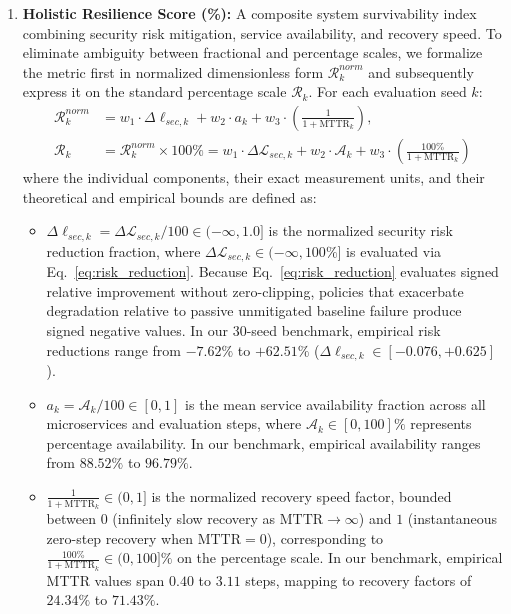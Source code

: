 \documentclass[11pt,a4paper]{article}
\begin{document}
\begin{enumerate}
    \item \textbf{Holistic Resilience Score (\%):} A composite system survivability index combining security risk mitigation, service availability, and recovery speed. To eliminate ambiguity between fractional and percentage scales, we formalize the metric first in normalized dimensionless form $\mathcal{R}_k^{norm}$ and subsequently express it on the standard percentage scale $\mathcal{R}_k$. For each evaluation seed $k$:
    \begin{align}
        \mathcal{R}_k^{norm} &= w_1 \cdot \Delta \ell_{sec, k} + w_2 \cdot a_k + w_3 \cdot \left(\frac{1}{1 + \text{MTTR}_k}\right), \label{eq:resilience_norm} \\
        \mathcal{R}_k &= \mathcal{R}_k^{norm} \times 100\% = w_1 \cdot \Delta \mathcal{L}_{sec, k} + w_2 \cdot \mathcal{A}_k + w_3 \cdot \left(\frac{100\%}{1 + \text{MTTR}_k}\right) \label{eq:resilience_pct}
    \end{align}
    where the individual components, their exact measurement units, and their theoretical and empirical bounds are defined as:
    \begin{itemize}
        \item $\Delta \ell_{sec, k} = \Delta \mathcal{L}_{sec, k} / 100 \in (-\infty, 1.0]$ is the normalized security risk reduction fraction, where $\Delta \mathcal{L}_{sec, k} \in (-\infty, 100\%]$ is evaluated via Eq.~\eqref{eq:risk_reduction}. Because Eq.~\eqref{eq:risk_reduction} evaluates signed relative improvement without zero-clipping, policies that exacerbate degradation relative to passive unmitigated baseline failure produce signed negative values. In our 30-seed benchmark, empirical risk reductions range from $-7.62\%$ to $+62.51\%$ ($\Delta \ell_{sec, k} \in [-0.076, +0.625]$).
        \item $a_k = \mathcal{A}_k / 100 \in [0, 1]$ is the mean service availability fraction across all microservices and evaluation steps, where $\mathcal{A}_k \in [0, 100]\%$ represents percentage availability. In our benchmark, empirical availability ranges from $88.52\%$ to $96.79\%$.
        \item $\frac{1}{1 + \text{MTTR}_k} \in (0, 1]$ is the normalized recovery speed factor, bounded between $0$ (infinitely slow recovery as $\text{MTTR} \to \infty$) and $1$ (instantaneous zero-step recovery when $\text{MTTR} = 0$), corresponding to $\frac{100\%}{1 + \text{MTTR}_k} \in (0, 100]\%$ on the percentage scale. In our benchmark, empirical MTTR values span $0.40$ to $3.11$ steps, mapping to recovery factors of $24.34\%$ to $71.43\%$.

\end{itemize}
\end{enumerate}
\end{document}
